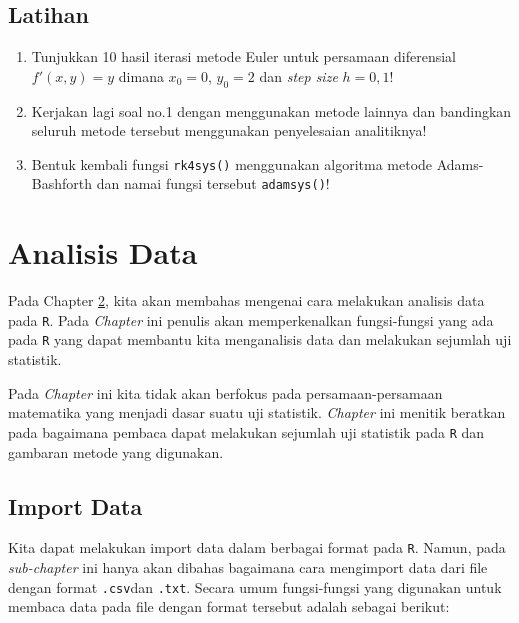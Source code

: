 \documentclass[
]{book}
\providecommand{\tightlist}{%
  \setlength{\itemsep}{0pt}\setlength{\parskip}{0pt}}
\theoremstyle{definition}
\theoremstyle{definition}
\theoremstyle{definition}
\theoremstyle{definition}
\theoremstyle{remark}
\begin{document}
\hypertarget{latihan-4}{%
\section{Latihan}\label{latihan-4}}

\begin{enumerate}
\def\labelenumi{\arabic{enumi}.}
\tightlist
\item
  Tunjukkan 10 hasil iterasi metode Euler untuk persamaan diferensial \(f'\left(x,y\right)=y\) dimana \(x_0=0\), \(y_0=2\) dan \emph{step size} \(h=0,1\)!
\item
  Kerjakan lagi soal no.1 dengan menggunakan metode lainnya dan bandingkan seluruh metode tersebut menggunakan penyelesaian analitiknya!
\item
  Bentuk kembali fungsi \texttt{rk4sys()} menggunakan algoritma metode Adams-Bashforth dan namai fungsi tersebut \texttt{adamsys()}!
\end{enumerate}

\hypertarget{dataanalysis}{%
\chapter{Analisis Data}\label{dataanalysis}}

Pada Chapter \ref{dataanalysis}, kita akan membahas mengenai cara melakukan analisis data pada \texttt{R}. Pada \emph{Chapter} ini penulis akan memperkenalkan fungsi-fungsi yang ada pada \texttt{R} yang dapat membantu kita menganalisis data dan melakukan sejumlah uji statistik.

Pada \emph{Chapter} ini kita tidak akan berfokus pada persamaan-persamaan matematika yang menjadi dasar suatu uji statistik. \emph{Chapter} ini menitik beratkan pada bagaimana pembaca dapat melakukan sejumlah uji statistik pada \texttt{R} dan gambaran metode yang digunakan.

\hypertarget{importdata}{%
\section{Import Data}\label{importdata}}

Kita dapat melakukan import data dalam berbagai format pada \texttt{R}. Namun, pada \emph{sub-chapter} ini hanya akan dibahas bagaimana cara mengimport data dari file dengan format \texttt{.csv}dan \texttt{.txt}. Secara umum fungsi-fungsi yang digunakan untuk membaca data pada file dengan format tersebut adalah sebagai berikut:
\end{document}
